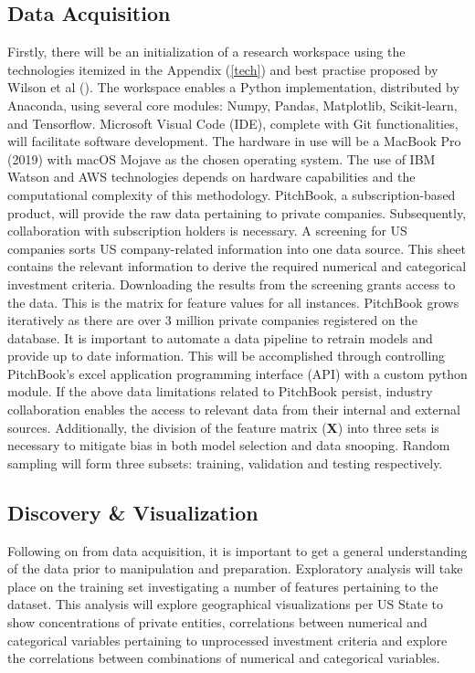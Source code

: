 \documentclass[12pt]{article}
\begin{document}
\subsection{Data Acquisition}
Firstly, there will be an initialization of a research workspace using the technologies itemized in the Appendix (\ref{tech}) and best practise proposed by Wilson et al (\citeyear{Wilson}).
The workspace enables a Python implementation, distributed by Anaconda, using several core modules: Numpy, Pandas, Matplotlib, Scikit-learn, and Tensorflow.
Microsoft Visual Code (IDE), complete with Git functionalities, will facilitate software development.
The hardware in use will be a MacBook Pro (2019) with macOS Mojave as the chosen operating system.
The use of IBM Watson and AWS technologies depends on hardware capabilities and the computational complexity of this methodology.
PitchBook, a subscription-based product, will provide the raw data pertaining to private companies.
Subsequently, collaboration with subscription holders is necessary.
A screening for US companies sorts US company-related information into one data source.
This sheet contains the relevant information to derive the required numerical and categorical investment criteria.
Downloading the results from the screening grants access to the data.
This is the matrix for feature values for all instances.
PitchBook grows iteratively as there are over 3 million private companies registered on the database.
It is important to automate a data pipeline to retrain models and provide up to date information.
This will be accomplished through controlling PitchBook's excel application programming interface (API) with a custom python module.
If the above data limitations related to PitchBook persist, 
industry collaboration enables the access to relevant data from their internal and external sources.
Additionally, the division of the feature matrix (\textbf{X}) into 
three sets is necessary to mitigate bias in both model selection and data snooping.
Random sampling will form three subsets: training, validation and testing respectively.
\subsection{Discovery \& Visualization}
Following on from data acquisition, it is important to get a general understanding of the data prior to manipulation and preparation.
Exploratory analysis will take place on the training set investigating a number of features pertaining to the dataset.
This analysis will explore geographical visualizations per US State to show concentrations of private entities,
correlations between numerical and categorical variables pertaining to unprocessed investment criteria
and explore the correlations between combinations of numerical and categorical variables.
\end{document}
